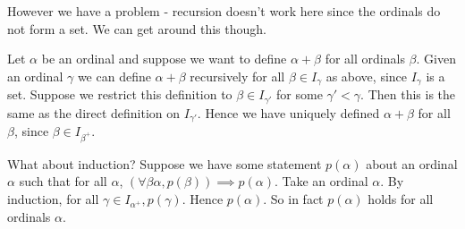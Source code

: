 \documentclass[10pt,a4paper]{article}
\begin{document}
However we have a problem - recursion doesn't work here since the ordinals do not form a set. We can get around this though.

Let $\alpha$ be an ordinal and suppose we want to define $\alpha + \beta$ for all ordinals $\beta$. Given an ordinal $\gamma$ we can define $\alpha + \beta$ recursively for all $\beta \in I_{\gamma}$ as above, since $I_{\gamma}$ is a set. Suppose we restrict this definition to $\beta \in I_{\gamma'}$ for some $\gamma' < \gamma$. Then this is the same as the direct definition on $I_{\gamma'}$. Hence we have uniquely defined $\alpha + \beta$ for all $\beta$, since $\beta \in I_{\beta^+}$.

What about induction? Suppose we have some statement $p(\alpha)$ about an ordinal $\alpha$ such that for all $\alpha$, $(\forall \beta  \alpha, p(\beta)) \implies p(\alpha)$. Take an ordinal $\alpha$. By induction, for all $\gamma \in I_{\alpha^+}, p(\gamma)$. Hence $p(\alpha)$. So in fact $p(\alpha)$ holds for all ordinals $\alpha$.
\end{document}
